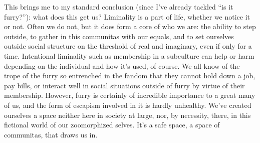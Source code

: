 This brings me to my standard conclusion (since I've already tackled ``is it furry?''): what does this get us? Liminality is a part of life, whether we notice it or not. Often we do not, but it does form a core of who we are: the ability to step outside, to gather in this communitas with our equals, and to set ourselves outside social structure on the threshold of real and imaginary, even if only for a time. Intentional liminality such as membership in a subculture can help or harm depending on the individual and how it's used, of course. We all know of the trope of the furry so entrenched in the fandom that they cannot hold down a job, pay bills, or interact well in social situations outside of furry by virtue of their membership. However, furry is certainly of incredible importance to a great many of us, and the form of escapism involved in it is hardly unhealthy. We've created ourselves a space neither here in society at large, nor, by necessity, there, in this fictional world of our zoomorphized selves. It's a safe space, a space of communitas, that draws us in.
